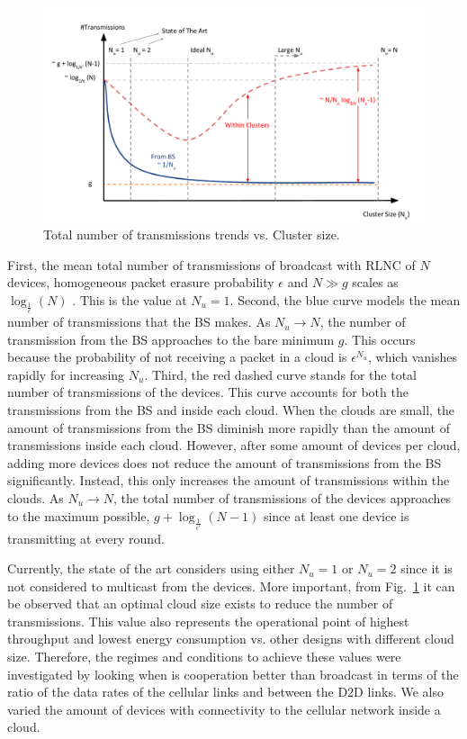 \begin{figure}[h]
  \centering
  \includegraphics[width=\textwidth]{introduction/figures/cloud_sizes.pdf}
  \caption{Total number of transmissions trends vs. Cluster size.}
\label{fig:cloud_sizes}
\end{figure}

First, the mean total number of transmissions of broadcast with \ac{RLNC} of $N$ devices, homogeneous packet erasure probability $\epsilon$ and $N \gg g$ scales as $\log_{\frac{1}{\epsilon}}(N)$ \cite{eryilmaz2008delay}. This is the value at $N_u = 1$. Second, the blue curve models the mean number of transmissions that the \ac{BS} makes. As $N_u \rightarrow N$, the number of transmission from the \ac{BS} approaches to the bare minimum $g$. This occurs because the probability of not receiving a packet in a cloud is ${\epsilon}^{N_u}$, which vanishes rapidly for increasing $N_u$. Third, the red dashed curve stands for the total number of transmissions of the devices. This curve accounts for both the transmissions from the \ac{BS} and inside each cloud. When the clouds are small, the amount of transmissions from the \ac{BS} diminish more rapidly than the amount of transmissions inside each cloud. However, after some amount of devices per cloud, adding more devices does not reduce the amount of transmissions from the \ac{BS} significantly. Instead, this only increases the amount of transmissions within the clouds. As $N_u \rightarrow N$, the total number of transmissions of the devices approaches to the maximum possible, $ g + \log_{\frac{1}{\epsilon'}}(N - 1)$ since at least one device is transmitting at every round.

Currently, the state of the art considers using either $N_u = 1$ or $N_u = 2$ since it is not considered to multicast from the devices. More important, from Fig.~\ref{fig:cloud_sizes} it can be observed that an optimal cloud size exists to reduce the number of transmissions. This value also represents the operational point of highest throughput and lowest energy consumption vs. other designs with different cloud size. Therefore, the regimes and conditions to achieve these values were investigated by looking when is cooperation better than broadcast in terms of the ratio of the data rates of the cellular links and between the \ac{D2D} links. We also varied the amount of devices with connectivity to the cellular network inside a cloud.

